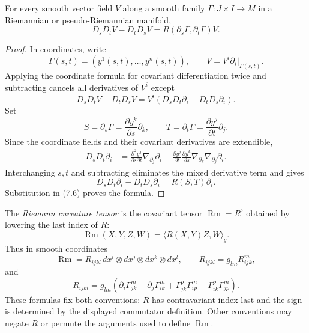 \begin{proposition}
\label{prop:curvature-commutator-failure}
For every smooth vector field $V$ along a smooth family
$\Gamma\colon J\times I\to M$ in a Riemannian or pseudo-Riemannian manifold,
\[
D_sD_tV-D_tD_sV=R(\partial_s\Gamma,\partial_t\Gamma)V.
\]
\end{proposition}

\begin{proof}
\sketch In coordinates, write
\[
\Gamma(s,t)=(y^1(s,t),\ldots,y^n(s,t)),
\qquad V=V^i\partial_i|_{\Gamma(s,t)}.
\]
Applying the coordinate formula for covariant differentiation twice and
subtracting cancels all derivatives of $V^i$ except
\begin{equation}
D_sD_tV-D_tD_sV
=V^i(D_sD_t\partial_i-D_tD_s\partial_i). \tag{7.6}
\end{equation}
Set
\[
S=\partial_s\Gamma=\frac{\partial y^k}{\partial s}\partial_k,
\qquad
T=\partial_t\Gamma=\frac{\partial y^j}{\partial t}\partial_j.
\]
Since the coordinate fields and their covariant derivatives are extendible,
\begin{align*}
D_sD_t\partial_i
&=\frac{\partial^2y^j}{\partial s\partial t}
  \nabla_{\partial_j}\partial_i
 +\frac{\partial y^j}{\partial t}
  \frac{\partial y^k}{\partial s}
  \nabla_{\partial_k}\nabla_{\partial_j}\partial_i.
\end{align*}
Interchanging $s,t$ and subtracting eliminates the mixed derivative term and
gives
\[
D_sD_t\partial_i-D_tD_s\partial_i
=R(S,T)\partial_i.
\]
Substitution in (7.6) proves the formula.
\end{proof}

The \emph{Riemann curvature tensor} is the covariant tensor
$\operatorname{Rm}=R^\flat$ obtained by lowering the last index of $R$:
\begin{equation}
\operatorname{Rm}(X,Y,Z,W)=\langle R(X,Y)Z,W\rangle_g. \tag{7.7}
\end{equation}
Thus in smooth coordinates
\[
\operatorname{Rm}=R_{ijkl}\,dx^i\otimes dx^j\otimes dx^k\otimes dx^l,
\qquad R_{ijkl}=g_{lm}R_{ijk}^m,
\]
and
\begin{equation}
R_{ijkl}=g_{lm}\left(
\partial_i\Gamma_{jk}^m-\partial_j\Gamma_{ik}^m
+\Gamma_{jk}^p\Gamma_{ip}^m-\Gamma_{ik}^p\Gamma_{jp}^m
\right). \tag{7.8}
\end{equation}
These formulas fix both conventions: $R$ has contravariant index last and the
sign is determined by the displayed commutator definition. Other conventions
may negate $R$ or permute the arguments used to define $\operatorname{Rm}$.

